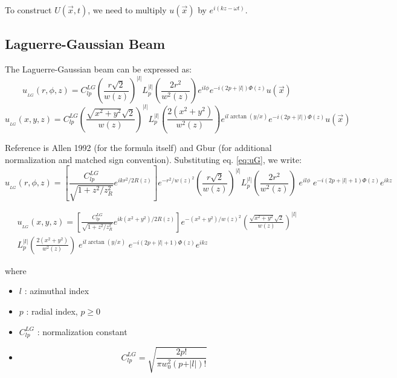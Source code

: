 \documentclass[11pt,letterpaper]{article}
\begin{document}
To construct $U(\vec{x},t)$, we need to multiply $u(\vec{x})$ by $e^{i(kz-\omega t)}$. 
\clearpage
\subsection{Laguerre-Gaussian Beam}
The Laguerre-Gaussian beam can be expressed as: 
\begin{equation}\label{eq:uLG}
u_{_{LG}}(r,\phi,z)= C^{LG}_{lp}
\left(\frac{r \sqrt{2}}{w(z)}\right)^{|l|}
L_p^{|l|}\left(\frac{2r^2}{w^2(z)}\right) 
e^{i l \phi} e^{-i(2p+|l|)\Phi(z)} u(\vec{x})
\end{equation}
\begin{equation}\label{eq:uLGcart}
u_{_{LG}}(x,y,z)= C^{LG}_{lp}
\left(\frac{\sqrt{x^2+y^2} \sqrt{2}}{w(z)}\right)^{|l|}
L_p^{|l|}\left(\frac{2(x^2+y^2)}{w^2(z)}\right) 
e^{i l \arctan(y/x)} e^{-i(2p+|l|)\Phi(z)} u(\vec{x})
\end{equation}

Reference is Allen 1992 (for the formula itself) and Gbur (for additional normalization and matched sign convention). Substituting eq. \ref{eq:uG}, we write:
\begin{equation}\label{eq:uLGfull}
\boxed{
u_{_{LG}}(r,\phi,z)= 
\left[\frac{C^{LG}_{lp}}{\sqrt{1+z^2/z_R^2}}  e^{ikr^2/2R(z)}\right] 
e^{-r^2/w(z)^2}
\left(\frac{r \sqrt{2}}{w(z)}\right)^{|l|}
L_p^{|l|}\left(\frac{2r^2}{w^2(z)}\right) 
\;e^{i l \phi}\;
 e^{-i(2p+|l|+1)\Phi(z)}e^{ikz}
 }
\end{equation}

\begin{eqnarray*}\label{eq:uLGfullcart}
u_{_{LG}}(x,y,z)= 
\left[\frac{C^{LG}_{lp}}{\sqrt{1+z^2/z_R^2}}  e^{ik(x^2+y^2)/2R(z)}\right] 
e^{-(x^2+y^2)/w(z)^2}
\left(\frac{\sqrt{x^2+y^2} \sqrt{2}}{w(z)}\right)^{|l|}\\
L_p^{|l|}\left(\frac{2(x^2+y^2)}{w^2(z)}\right) 
\;e^{i l \arctan(y/x)}\;
 e^{-i(2p+|l|+1)\Phi(z)}e^{ikz}
 \end{eqnarray*}

where
\begin{itemize}
\item[] $l$ : azimuthal index
\item[] $p$ : radial index, $p\geq 0$ 
\item[] $C^{LG}_{lp}$ : normalization constant
\item[] \[C^{LG}_{lp} = \sqrt{\frac{2p!}{\pi w_0^2 (p+\vert l \vert)!}}\]
\end{itemize}
\end{document}
